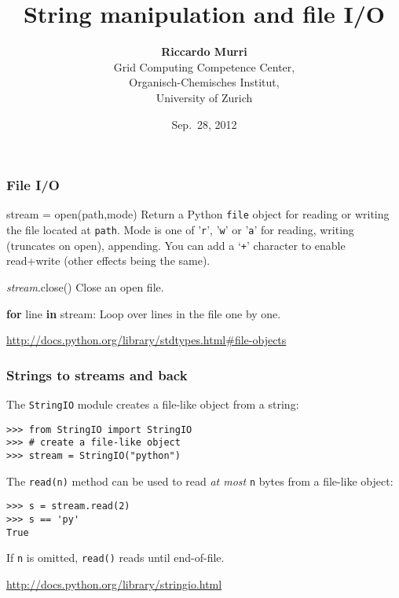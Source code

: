 \documentclass[english,serif,mathserif,xcolor=pdftex,dvipsnames,table]{beamer}
\title[Part 4]{%
  String manipulation and file I/O
}
\author[R. Murri]{%
  \textbf{Riccardo Murri} \\
  Grid Computing Competence Center, \\
  Organisch-Chemisches Institut, \\
  University of Zurich
}
\date{Sep.~28, 2012}
\begin{document}
\maketitle

\begin{frame}[fragile]
  \frametitle{File I/O}

  \begin{describe}{\ttfamily stream = open(path,mode)}
    Return a Python \texttt{file} object for reading or writing the
    file located at \texttt{path}.  Mode is one of '\texttt{r}',
    '\texttt{w}' or '\texttt{a}' for reading, writing (truncates on open), appending.
    You can add a `\texttt{+}' character to enable read+write (other
    effects being the same).
  \end{describe}

  \begin{describe}{\ttfamily \emph{stream}.close()}
    Close an open file.
  \end{describe}
  
  \begin{describe}{\ttfamily \textbf{for} line \textbf{in} stream:}
    Loop over lines in the file one by one.
  \end{describe}

  \begin{references}
    \url{http://docs.python.org/library/stdtypes.html#file-objects}
  \end{references}
\end{frame}


\begin{frame}[fragile]
  \frametitle{Strings to streams and back}

  The \texttt{StringIO} module creates a file-like object from a
  string:
\begin{lstlisting}
>>> from StringIO import StringIO
>>> # create a file-like object
>>> stream = StringIO("python")
\end{lstlisting}

  \+
  The \lstinline|read(n)| method can be used to read \emph{at most}
  \lstinline|n| bytes from a file-like object:
\begin{lstlisting}
>>> s = stream.read(2)
>>> s == 'py'
True
\end{lstlisting}
  If \lstinline|n| is omitted, \texttt{read()} reads until end-of-file.

  \begin{references}
    \url{http://docs.python.org/library/stringio.html}
  \end{references}
\end{frame}
\end{document}
